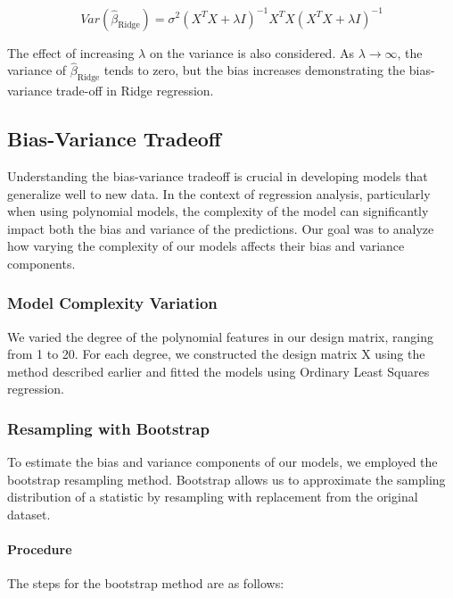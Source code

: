 \documentclass{article}
\begin{document}
\[
Var(\hat{\beta}_{\text{Ridge}}) = \sigma^2(X^TX + \lambda I)^{-1}X^TX(X^TX + \lambda I)^{-1}
\]

The effect of increasing \( \lambda \)  on the variance is also considered. As \( \lambda \to \infty \), the variance of \( \hat{\beta}_{\text{Ridge}} \) tends to zero, but the bias increases demonstrating the bias-variance trade-off in Ridge regression.  
\newline


\subsection{Bias-Variance Tradeoff}

Understanding the bias-variance tradeoff is crucial in developing models that generalize well to new data. In the context of regression analysis, particularly when using polynomial models, the complexity of the model can significantly impact both the bias and variance of the predictions. Our goal was to analyze how varying the complexity of our models affects their bias and variance components.

\subsubsection{Model Complexity Variation}

We varied the degree of the polynomial features in our design matrix, ranging from 1 to 20. For each degree, we constructed the design matrix X using the method described earlier and fitted the models using Ordinary Least Squares regression.

\subsubsection{Resampling with Bootstrap}

To estimate the bias and variance components of our models, we employed the bootstrap resampling method. Bootstrap allows us to approximate the sampling distribution of a statistic by resampling with replacement from the original dataset.

\paragraph{Procedure}

The steps for the bootstrap method are as follows:
\end{document}
